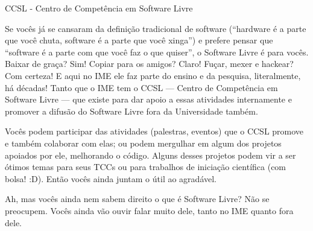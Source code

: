 \begin{secao}{CCSL - Centro de Competência em Software Livre}

Se vocês já se cansaram da definição tradicional de software (``hardware é a
parte que você chuta, software é a parte que você xinga'') e prefere pensar que
``software é a parte com que você faz o que quiser'', o Software Livre é para
vocês. Baixar de graça? Sim! Copiar para os amigos? Claro! Fuçar, mexer e
hackear? Com certeza! E aqui no IME ele faz parte do ensino e da pesquisa,
literalmente, há décadas! Tanto que o IME tem o CCSL — Centro de Competência em
Software Livre — que existe para dar apoio a essas atividades internamente e
promover a difusão do Software Livre fora da Universidade também.

Vocês podem participar das atividades (palestras, eventos) que o CCSL
promove e também colaborar com elas; ou podem mergulhar em algum dos
projetos apoiados por ele, melhorando o código. Alguns desses projetos
podem vir a ser ótimos temas para seus TCCs ou para trabalhos de
iniciação científica (com bolsa! :D). Então vocês ainda juntam o útil ao
agradável.

Ah, mas vocês ainda nem sabem direito o que é Software Livre? Não se preocupem.
Vocês ainda vão ouvir falar muito dele, tanto no IME quanto fora dele.

\end{secao}
